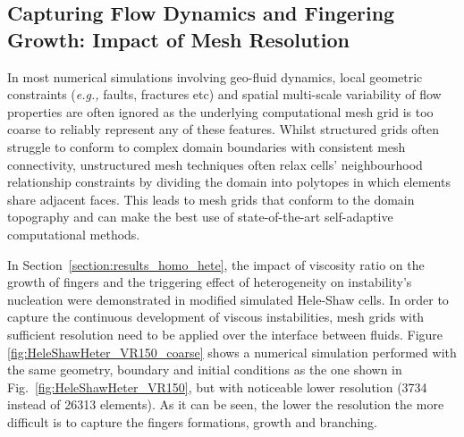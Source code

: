 \documentclass[preprint,authoryear,12pt]{elsarticle}
\newcommand{\eg}{{\it e.g., }}
\begin{document}
\subsection{Capturing Flow Dynamics and Fingering Growth: Impact of Mesh Resolution}\label{section:results_hete_fix_adapt}    
In most numerical simulations involving geo-fluid dynamics, local geometric constraints (\eg faults, fractures etc) and spatial multi-scale variability of flow properties are often ignored as the underlying computational mesh grid is too coarse to reliably represent any of these features. Whilst structured grids often struggle to conform to complex domain boundaries with consistent mesh connectivity, unstructured mesh techniques often relax cells' neighbourhood relationship constraints by dividing the domain into polytopes in which elements share adjacent faces. This leads to mesh grids that conform to the domain topography and can make the best use of state-of-the-art self-adaptive computational methods.

\medskip
In Section~\ref{section:results_homo_hete}, the impact of viscosity ratio on the growth of fingers and the triggering effect of heterogeneity on instability's nucleation were demonstrated in modified simulated Hele-Shaw cells. In order to capture the continuous development of viscous instabilities, mesh grids with sufficient resolution need to be applied over the interface between fluids. Figure \ref{fig:HeleShawHeter_VR150_coarse} shows a numerical simulation performed with the same geometry, boundary and initial conditions as the one shown in Fig.~\ref{fig:HeleShawHeter_VR150}, but with noticeable lower resolution (3734 instead of 26313 elements). As it can be seen, the lower the resolution the more difficult is to capture the fingers formations, growth and branching.
\end{document}
